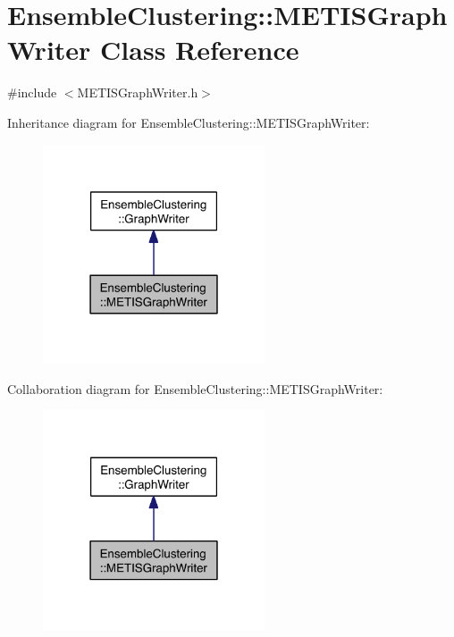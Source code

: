 \hypertarget{class_ensemble_clustering_1_1_m_e_t_i_s_graph_writer}{\section{Ensemble\-Clustering\-:\-:M\-E\-T\-I\-S\-Graph\-Writer Class Reference}
\label{class_ensemble_clustering_1_1_m_e_t_i_s_graph_writer}
}


{\ttfamily \#include $<$M\-E\-T\-I\-S\-Graph\-Writer.\-h$>$}



Inheritance diagram for Ensemble\-Clustering\-:\-:M\-E\-T\-I\-S\-Graph\-Writer\-:
\nopagebreak
\begin{figure}[H]
\begin{center}
\leavevmode
\includegraphics[width=186pt]{class_ensemble_clustering_1_1_m_e_t_i_s_graph_writer__inherit__graph}
\end{center}
\end{figure}


Collaboration diagram for Ensemble\-Clustering\-:\-:M\-E\-T\-I\-S\-Graph\-Writer\-:
\nopagebreak
\begin{figure}[H]
\begin{center}
\leavevmode
\includegraphics[width=186pt]{class_ensemble_clustering_1_1_m_e_t_i_s_graph_writer__coll__graph}
\end{center}
\end{figure}

